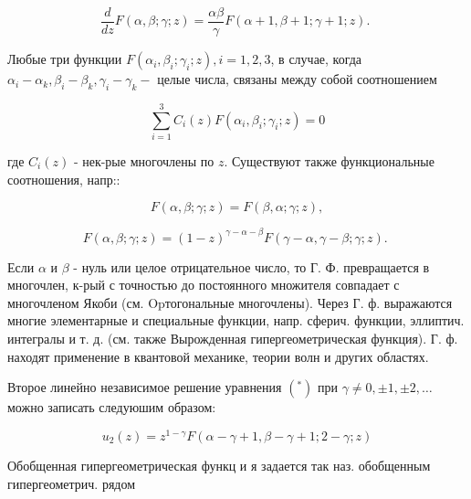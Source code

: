 \documentclass[10pt]{article}
\begin{document}
\[

\frac{d}{d z} F(\alpha, \beta ; \gamma ; z)=\frac{\alpha \beta}{\gamma} F(\alpha+1, \beta+1 ; \gamma+1 ; z) \text {. }

\]



Любые три функции $F\left(\alpha_{i}, \beta_{i} ; \gamma_{i} ; z\right), i=1,2,3$, в случае, когда $\alpha_{i}-\alpha_{k}, \beta_{i}-\beta_{k}, \gamma_{i}-\gamma_{k}-$ целые числа, связаны между собой соотношением



\[

\sum_{i=1}^{3} C_{i}(z) F\left(\alpha_{i}, \beta_{i} ; \gamma_{i} ; z\right)=0

\]



где $C_{i}(z)$ - нек-рые многочлены по $z$. Существуют также функциональные соотношения, напр::



\[

F(\alpha, \beta ; \gamma ; z)=F(\beta, \alpha ; \gamma ; z),

\]



\[

F(\alpha, \beta ; \gamma ; z)=(1-z)^{\gamma-\alpha-\beta} F(\gamma-\alpha, \gamma-\beta ; \gamma ; z) \text {. }

\]



Если $\alpha$ и $\beta$ - нуль или целое отрицательное число, то Г. Ф. превращается в многочлен, к-рый с точностью до постоянного множителя совпадает с многочленом Якоби (см. Opтогональные многочлены). Через Г. ф. выражаются многие элементарные и специальные функции, напр. сферич. функции, эллиптич. интегралы и т. д. (см. также Вырожденная гипергеометрическая функция). Г. ф. находят применение в квантовой механике, теории волн и других областях.



Второе линейно независимое решение уравнения $\left({ }^{*}\right)$ при $\gamma \neq 0, \pm 1, \pm 2, \ldots$ можно записать следуюшим образом:



\[

u_{2}(z)=z^{1-\gamma} F(\alpha-\gamma+1, \beta-\gamma+1 ; 2-\gamma ; z)

\]



Обобщенная гипергеометрическая функц и я задается так наз. обобщенным гипергеометрич. рядом
\end{document}
